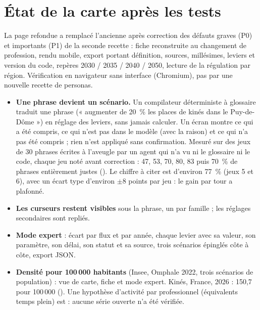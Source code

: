 \section{État de la carte après les tests}
La page refondue a remplacé l'ancienne après correction des défauts graves (P0) et importants (P1) de la seconde recette :
fiche reconstruite au changement de profession, rendu mobile, export portant définition, sources, millésimes, leviers et
version du code, repères 2030 / 2035 / 2040 / 2050, lecture de la régulation par région. Vérification en navigateur sans
interface (Chromium), pas par une nouvelle recette de personas.
\begin{itemize}
  \item \textbf{Une phrase devient un scénario.} Un compilateur déterministe à glossaire traduit une phrase
        (« augmenter de 20~\% les places de kinés dans le Puy-de-Dôme ») en réglage des leviers, sans jamais calculer.
        Un écran montre ce qui a été compris, ce qui n'est pas dans le modèle (avec la raison) et ce qui n'a pas été
        compris ; rien n'est appliqué sans confirmation. Mesuré sur des jeux de 30 phrases écrites à l'aveugle par un
        agent qui n'a vu ni le glossaire ni le code, chaque jeu noté avant correction : 47, 53, 70, 80, 83 puis 70~\%
        de phrases entièrement justes (\mesure). Le chiffre à citer est d'environ 77~\% (jeux 5 et 6), avec un écart
        type d'environ $\pm 8$ points par jeu : le gain par tour a plafonné.
  \item \textbf{Les curseurs restent visibles} sous la phrase, un par famille ; les réglages secondaires sont repliés.
  \item \textbf{Mode expert} : écart par flux et par année, chaque levier avec sa valeur, son paramètre, son délai,
        son statut et sa source, trois scénarios épinglés côte à côte, export JSON.
  \item \textbf{Densité pour 100\,000 habitants} (Insee, Omphale 2022, trois scénarios de population) : vue de carte,
        fiche et mode expert. Kinés, France, 2026 : 150,7 pour 100\,000 (\mesure). Une hypothèse d'activité par
        professionnel (équivalents temps plein) est \suppose{} : aucune série ouverte n'a été vérifiée.
\end{itemize}

